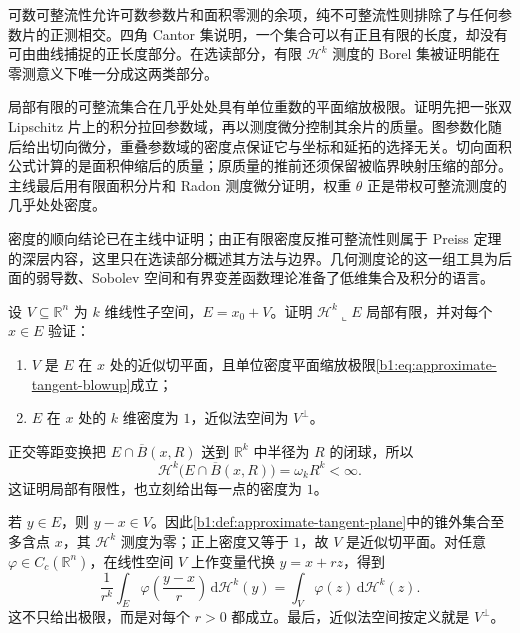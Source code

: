 



\begin{chaptersummary}
可数可整流性允许可数参数片和面积零测的余项，纯不可整流性则排除了与任何参数片的正测相交。四角 Cantor 集说明，一个集合可以有正且有限的长度，却没有可由曲线捕捉的正长度部分。在选读部分，有限 \(\mathcal H^k\) 测度的 Borel 集被证明能在零测意义下唯一分成这两类部分。

\ProseParagraphBreak

局部有限的可整流集合在几乎处处具有单位重数的平面缩放极限。证明先把一张双 Lipschitz 片上的积分拉回参数域，再以测度微分控制其余片的质量。图参数化随后给出切向微分，重叠参数域的密度点保证它与坐标和延拓的选择无关。切向面积公式计算的是面积伸缩后的质量；原质量的推前还须保留被临界映射压缩的部分。主线最后用有限面积分片和 Radon 测度微分证明，权重 \(\theta\) 正是带权可整流测度的几乎处处密度。

\ProseParagraphBreak

密度的顺向结论已在主线中证明；由正有限密度反推可整流性则属于 Preiss 定理的深层内容，这里只在选读部分概述其方法与边界。几何测度论的这一组工具为后面的弱导数、Sobolev 空间和有界变差函数理论准备了低维集合及积分的语言。
\end{chaptersummary}


\BookExercises


\begin{exercise}\label{b1:ex:19-linear-plane-basics}
设 \(V\subseteq\mathbb R^n\) 为 \(k\) 维线性子空间，\(E=x_0+V\)。证明 \(\mathcal H^k\llcorner E\) 局部有限，并对每个 \(x\in E\) 验证：
\begin{enumerate}
\item \(V\) 是 \(E\) 在 \(x\) 处的近似切平面，且单位密度平面缩放极限\eqref{b1:eq:approximate-tangent-blowup}成立；
\item \(E\) 在 \(x\) 处的 \(k\) 维密度为 \(1\)，近似法空间为 \(V^\perp\)。
\end{enumerate}
\end{exercise}
\begin{solution}
正交等距变换把 \(E\cap\overline B(x,R)\) 送到 \(\mathbb R^k\) 中半径为 \(R\) 的闭球，所以
\[
 \mathcal H^k\bigl(E\cap\overline B(x,R)\bigr)=\omega_kR^k<\infty.
\]
这证明局部有限性，也立刻给出每一点的密度为 \(1\)。

若 \(y\in E\)，则 \(y-x\in V\)。因此\cref{b1:def:approximate-tangent-plane}中的锥外集合至多含点 \(x\)，其 \(\mathcal H^k\) 测度为零；正上密度又等于 \(1\)，故 \(V\) 是近似切平面。对任意 \(\varphi\in C_c(\mathbb R^n)\)，在线性空间 \(V\) 上作变量代换 \(y=x+rz\)，得到
\[
 \frac1{r^k}\int_E\varphi\left(\frac{y-x}{r}\right)
     \,\mathrm d\mathcal H^k(y)
 =\int_V\varphi(z)\,\mathrm d\mathcal H^k(z).
\]
这不只给出极限，而是对每个 \(r>0\) 都成立。最后，近似法空间按定义就是 \(V^\perp\)。
\end{solution}

